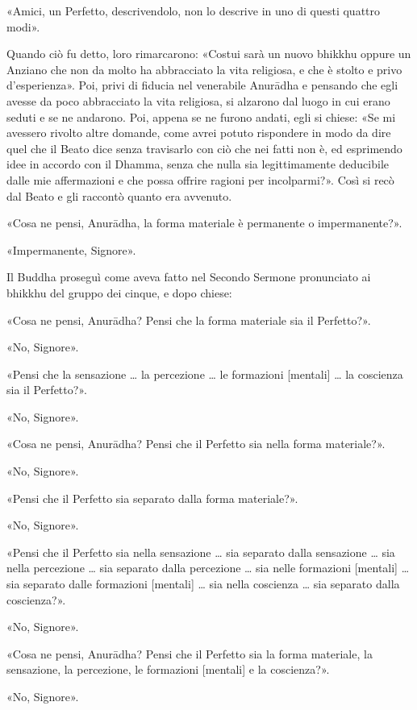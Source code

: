 «Amici, un Perfetto, descrivendolo, non lo descrive in uno di questi
quattro modi».


Quando ciò fu detto, loro rimarcarono: «Costui sarà un nuovo bhikkhu
oppure un Anziano che non da molto ha abbracciato la vita religiosa, e
che è stolto e privo d’esperienza». Poi, privi di fiducia nel venerabile
Anurādha e pensando che egli avesse da poco abbracciato la vita
religiosa, si alzarono dal luogo in cui erano seduti e se ne andarono.
Poi, appena se ne furono andati, egli si chiese: «Se mi avessero rivolto
altre domande, come avrei potuto rispondere in modo da dire quel che il
Beato dice senza travisarlo con ciò che nei fatti non è, ed esprimendo
idee in accordo con il Dhamma, senza che nulla sia legittimamente
deducibile dalle mie affermazioni e che possa offrire ragioni per
incolparmi?». Così si recò dal Beato e gli raccontò quanto era avvenuto.


«Cosa ne pensi, Anurādha, la forma materiale è permanente o
impermanente?».


«Impermanente, Signore».


 Il Buddha proseguì come aveva fatto nel Secondo
Sermone pronunciato ai bhikkhu del gruppo dei cinque, e dopo chiese:


«Cosa ne pensi, Anurādha? Pensi che la forma materiale sia il
Perfetto?».


«No, Signore».


«Pensi che la sensazione … la percezione … le formazioni [mentali] … la
coscienza sia il Perfetto?».


«No, Signore».


«Cosa ne pensi, Anurādha? Pensi che il Perfetto sia nella forma
materiale?».


«No, Signore».


«Pensi che il Perfetto sia separato dalla forma materiale?».


«No, Signore».


«Pensi che il Perfetto sia nella sensazione … sia separato dalla sensazione …
sia nella percezione … sia separato dalla percezione … sia nelle formazioni
[mentali] … sia separato dalle formazioni [mentali] … sia nella coscienza
… sia separato dalla coscienza?».


«No, Signore».


«Cosa ne pensi, Anurādha? Pensi che il Perfetto sia la forma materiale,
la sensazione, la percezione, le formazioni [mentali] e la coscienza?».


«No, Signore».


